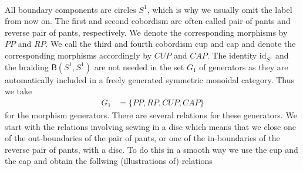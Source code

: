 \\
All boundary components are circles $S^{1}$, which is why we usually omit the label from now on. The first and second cobordism are often called pair of pants and reverse pair of pants, respectively. We denote the corresponding morphisms by $PP$ and $RP$. We call the third and fourth cobordism cup and cap and denote the corresponding morphisms accordingly by $CUP$ and $CAP$. The identity $\mathrm{id}_{S^{1}}$ and the braiding $\mathsf{B}(S^{1},S^{1})$ are not needed in the set $G_{1}$ of generators as they are automatically included in a freely generated symmetric monoidal category. Thus we take
\begin{align*}
  G_{1}
  &=
  \lbrace
    PP
    ,
    RP
    ,
    CUP
    ,
    CAP
  \rbrace
\end{align*}
for the morphism generators. There are several relations for these generators. We start with the relations involving {\glqq}sewing in a disc{\grqq} which means that we close one of the out-boundaries of the pair of pants, or one of the in-boundaries of the reverse pair of pants, with a disc. To do this in a smooth way we use the cup and the cap and obtain the follwing (illustrations of) relations
\\
